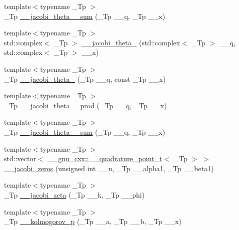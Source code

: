 \begin{DoxyCompactItemize}
\item 
{\footnotesize template$<$typename \+\_\+\+Tp $>$ }\\\+\_\+\+Tp \hyperlink{namespacestd_1_1____detail_a07e080795e7f80c5a0b733d6bac49675}{\+\_\+\+\_\+jacobi\+\_\+theta\+\_\+\_\+sum} (\+\_\+\+Tp \+\_\+\+\_\+q, \+\_\+\+Tp \+\_\+\+\_\+x)
\item 
{\footnotesize template$<$typename \+\_\+\+Tp $>$ }\\std\+::complex$<$ \+\_\+\+Tp $>$ \hyperlink{namespacestd_1_1____detail_a1cb3d69015e808baeaf98cd3310f38c3}{\+\_\+\+\_\+jacobi\+\_\+theta\+\_} (std\+::complex$<$ \+\_\+\+Tp $>$ \+\_\+\+\_\+q, std\+::complex$<$ \+\_\+\+Tp $>$ \+\_\+\+\_\+x)
\item 
{\footnotesize template$<$typename \+\_\+\+Tp $>$ }\\\+\_\+\+Tp \hyperlink{namespacestd_1_1____detail_a0e4199a4d77f33d27b09063b25c99b7f}{\+\_\+\+\_\+jacobi\+\_\+theta\+\_} (\+\_\+\+Tp \+\_\+\+\_\+q, const \+\_\+\+Tp \+\_\+\+\_\+x)
\item 
{\footnotesize template$<$typename \+\_\+\+Tp $>$ }\\\+\_\+\+Tp \hyperlink{namespacestd_1_1____detail_a577345a46215dd84c03eb4c760dbf7f4}{\+\_\+\+\_\+jacobi\+\_\+theta\+\_\+\_\+prod} (\+\_\+\+Tp \+\_\+\+\_\+q, \+\_\+\+Tp \+\_\+\+\_\+x)
\item 
{\footnotesize template$<$typename \+\_\+\+Tp $>$ }\\\+\_\+\+Tp \hyperlink{namespacestd_1_1____detail_a6f1dd356335537ad693089ccb8d8c755}{\+\_\+\+\_\+jacobi\+\_\+theta\+\_\+\_\+sum} (\+\_\+\+Tp \+\_\+\+\_\+q, \+\_\+\+Tp \+\_\+\+\_\+x)
\item 
{\footnotesize template$<$typename \+\_\+\+Tp $>$ }\\std\+::vector$<$ \hyperlink{struct____gnu__cxx_1_1____quadrature__point__t}{\+\_\+\+\_\+gnu\+\_\+cxx\+::\+\_\+\+\_\+quadrature\+\_\+point\+\_\+t}$<$ \+\_\+\+Tp $>$ $>$ \hyperlink{namespacestd_1_1____detail_a53800598007d45e144cf147c2408a3d6}{\+\_\+\+\_\+jacobi\+\_\+zeros} (unsigned int \+\_\+\+\_\+n, \+\_\+\+Tp \+\_\+\+\_\+alpha1, \+\_\+\+Tp \+\_\+\+\_\+beta1)
\item 
{\footnotesize template$<$typename \+\_\+\+Tp $>$ }\\\+\_\+\+Tp \hyperlink{namespacestd_1_1____detail_a1d5fc69202703d72974c4370fd7ade03}{\+\_\+\+\_\+jacobi\+\_\+zeta} (\+\_\+\+Tp \+\_\+\+\_\+k, \+\_\+\+Tp \+\_\+\+\_\+phi)
\item 
{\footnotesize template$<$typename \+\_\+\+Tp $>$ }\\\+\_\+\+Tp \hyperlink{namespacestd_1_1____detail_a826af8d14ad1914733d751cbb4561957}{\+\_\+\+\_\+kolmogorov\+\_\+p} (\+\_\+\+Tp \+\_\+\+\_\+a, \+\_\+\+Tp \+\_\+\+\_\+b, \+\_\+\+Tp \+\_\+\+\_\+x)

\end{DoxyCompactItemize}
